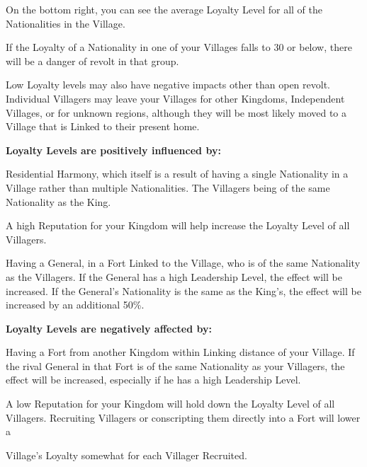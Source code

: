 On the bottom right, you can see the average Loyalty Level for all of the Nationalities in the Village.

If the Loyalty of a Nationality in one of your Villages falls to 30 or below, there will be a danger of revolt in that group.


Low Loyalty levels may also have negative impacts other than open revolt. Individual Villagers may leave your Villages for other Kingdoms, Independent Villages, or for unknown regions, although they will be most likely moved to a Village that is Linked to their present home.


\textbf{Loyalty Levels are positively influenced by:}


\begin{changemargin}{.5cm}{0cm}
Residential Harmony, which itself is a result of having a single Nationality in a Village rather than multiple Nationalities. The Villagers being of the same Nationality as the King.

A high Reputation for your Kingdom will help increase the Loyalty Level of all Villagers.

Having a General, in a Fort Linked to the Village, who is of the same Nationality as the Villagers. If the General has a high Leadership Level, the effect will be increased. If the General’s Nationality is the same as the King’s, the effect will be increased by an additional 50\%.
\end{changemargin}


\textbf{Loyalty Levels are negatively affected by:}

\begin{changemargin}{.5cm}{0cm}
Having a Fort from another Kingdom within Linking distance of your Village. If the rival General in that Fort is of the same Nationality as your Villagers, the effect will be increased, especially if he has a high Leadership Level.

A low Reputation for your Kingdom will hold down the Loyalty Level of all Villagers.
Recruiting Villagers or conscripting them directly into a Fort will lower a 

Village’s Loyalty somewhat for each Villager Recruited.
\end{changemargin}



